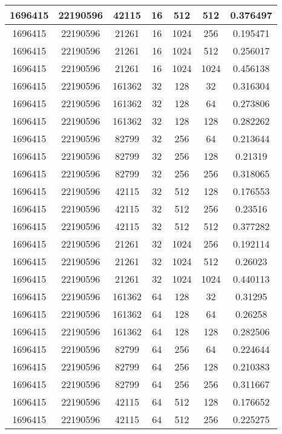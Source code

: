 \documentclass[9pt]{article}
\begin{document}
\begin{tabular}{|c|c|c|c|c|c|c| }
\hline
1696415  & 22190596  & 42115  & 16  & 512  & 512  & 0.376497 \\
\hline
1696415  & 22190596  & 21261  & 16  & 1024  & 256  & 0.195471 \\
\hline
1696415  & 22190596  & 21261  & 16  & 1024  & 512  & 0.256017 \\
\hline
1696415  & 22190596  & 21261  & 16  & 1024  & 1024  & 0.456138 \\
\hline
1696415  & 22190596  & 161362  & 32  & 128  & 32  & 0.316304 \\
\hline
1696415  & 22190596  & 161362  & 32  & 128  & 64  & 0.273806 \\
\hline
1696415  & 22190596  & 161362  & 32  & 128  & 128  & 0.282262 \\
\hline
1696415  & 22190596  & 82799  & 32  & 256  & 64  & 0.213644 \\
\hline
1696415  & 22190596  & 82799  & 32  & 256  & 128  & 0.21319 \\
\hline
1696415  & 22190596  & 82799  & 32  & 256  & 256  & 0.318065 \\
\hline
1696415  & 22190596  & 42115  & 32  & 512  & 128  & 0.176553 \\
\hline
1696415  & 22190596  & 42115  & 32  & 512  & 256  & 0.23516 \\
\hline
1696415  & 22190596  & 42115  & 32  & 512  & 512  & 0.377282 \\
\hline
1696415  & 22190596  & 21261  & 32  & 1024  & 256  & 0.192114 \\
\hline
1696415  & 22190596  & 21261  & 32  & 1024  & 512  & 0.26023 \\
\hline
1696415  & 22190596  & 21261  & 32  & 1024  & 1024  & 0.440113 \\
\hline
1696415  & 22190596  & 161362  & 64  & 128  & 32  & 0.31295 \\
\hline
1696415  & 22190596  & 161362  & 64  & 128  & 64  & 0.26258 \\
\hline
1696415  & 22190596  & 161362  & 64  & 128  & 128  & 0.282506 \\
\hline
1696415  & 22190596  & 82799  & 64  & 256  & 64  & 0.224644 \\
\hline
1696415  & 22190596  & 82799  & 64  & 256  & 128  & 0.210383 \\
\hline
1696415  & 22190596  & 82799  & 64  & 256  & 256  & 0.311667 \\
\hline
1696415  & 22190596  & 42115  & 64  & 512  & 128  & 0.176652 \\
\hline
1696415  & 22190596  & 42115  & 64  & 512  & 256  & 0.225275 \\

\end{tabular}
\end{document}
